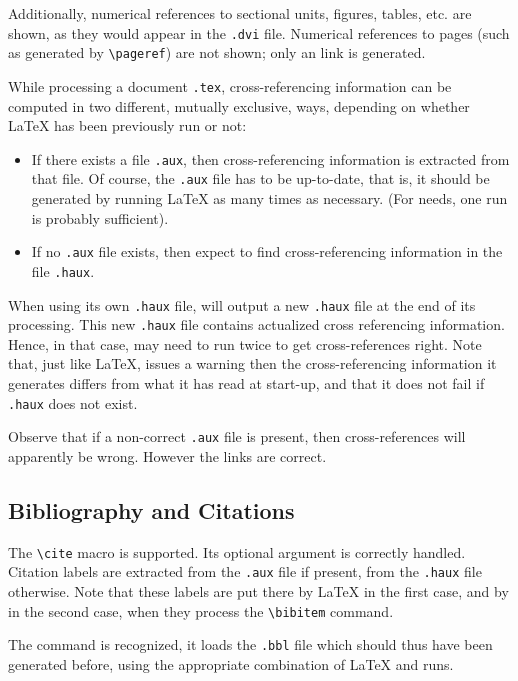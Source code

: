 Additionally, numerical references to sectional units, figures,
tables, etc. are shown, as they would appear in the \texttt{.dvi}
file.
Numerical references to pages (such as generated by \verb+\pageref+)
are not shown; only an link is generated.

While processing a document \texttt{.tex},
cross-referencing information can be computed in two different, mutually
exclusive, ways, depending
on whether \LaTeX{} has been previously run or not:
\begin{itemize}
\item If there exists a file 
\texttt{.aux}, then cross-referencing information is extracted
from that file. Of course, the \texttt{.aux} file
has to be up-to-date, that is,
it should be generated by running \LaTeX{} as many times as necessary.
(For \hevea{} needs, one run is probably sufficient).
\item If no \texttt{.aux} file exists, then \hevea{}
expect to find cross-referencing information in the file
\texttt{.haux}.
\end{itemize}
When using its own \texttt{.haux} file,
\hevea{} will output a
new \texttt{.haux} file at the end of its processing.
This new  \texttt{.haux} file contains actualized
cross referencing information.
Hence, in that case, \hevea{} may need to run twice to get
cross-references right.
Note that, just like \LaTeX,
\hevea{} issues a warning then the cross-referencing information it
generates differs from what it has read at start-up, and that it does
not fail if \texttt{.haux} does not exist.


Observe that if a non-correct \texttt{.aux} file is
present, then cross-references will apparently be wrong. However the
links are correct.


\subsection{Bibliography and Citations}
The \verb+\cite+ macro is supported. Its optional argument is
correctly handled. Citation labels  are extracted from the
\texttt{.aux} file if present, from the \texttt{.haux} file otherwise.
Note that these labels are put there by \LaTeX{} in the first case,
and by \hevea{} in the second case, when they process the
\verb+\bibitem+ command.

The \verb++ command is
recognized, it loads the \texttt{.bbl} file which should thus
have been generated before, using the appropriate combination of
\LaTeX{} and \BibTeX{} runs.

